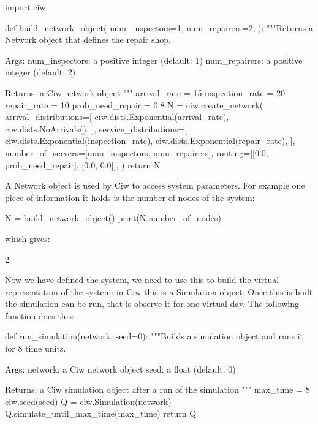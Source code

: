 \begin{pyin}
import ciw


def build_network_object(
    num_inspectors=1, num_repairers=2,
):
    """Returns a Network object that defines the repair shop.

    Args:
        num_inspectors: a positive integer (default: 1)
        num_repairers: a positive integer (default: 2)

    Returns:
        a Ciw network object
    """
    arrival_rate = 15
    inspection_rate = 20
    repair_rate = 10
    prob_need_repair = 0.8
    N = ciw.create_network(
        arrival_distributions=[
            ciw.dists.Exponential(arrival_rate),
            ciw.dists.NoArrivals(),
        ],
        service_distributions=[
            ciw.dists.Exponential(inspection_rate),
            ciw.dists.Exponential(repair_rate),
        ],
        number_of_servers=[num_inspectors, num_repairers],
        routing=[[0.0, prob_need_repair], [0.0, 0.0]],
    )
    return N
\end{pyin}

A Network object is used by Ciw to access system parameters. For example one
piece of information it holds is the number of nodes of the system:

\begin{pyin}
N = build_network_object()
print(N.number_of_nodes)
\end{pyin}

which gives:

\begin{pyout}
2
\end{pyout}

Now we have defined the system, we need to use this to build the virtual
representation of the system: in Ciw this is a Simulation object.
Once this is built the simulation can be run, that is observe it for one
virtual day. The following function does this:

\begin{pyin}
def run_simulation(network, seed=0):
    """Builds a simulation object and runs it for 8 time units.

    Args:
        network: a Ciw network object
        seed: a float (default: 0)

    Returns:
        a Ciw simulation object after a run of the simulation
    """
    max_time = 8
    ciw.seed(seed)
    Q = ciw.Simulation(network)
    Q.simulate_until_max_time(max_time)
    return Q
\end{pyin}

